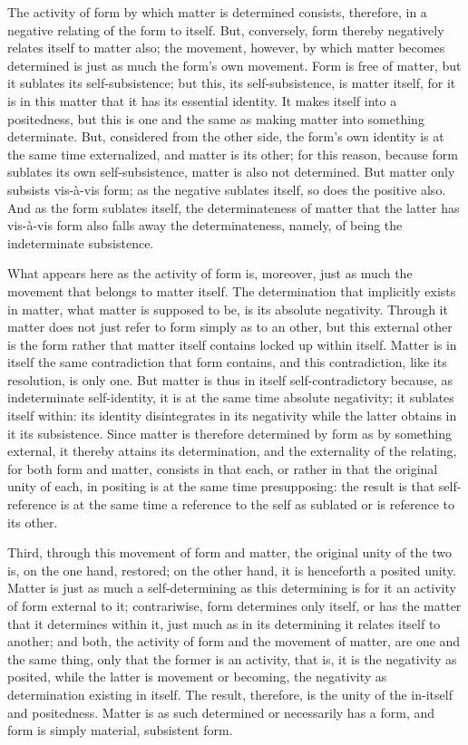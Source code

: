 The activity of form by which matter is determined consists,
therefore, in a negative relating of the form to itself.
But, conversely, form thereby negatively relates itself to matter also;
the movement, however, by which matter becomes determined is
just as much the form's own movement.
Form is free of matter, but it sublates its self-subsistence;
but this, its self-subsistence, is matter itself,
for it is in this matter that it has its essential identity.
It makes itself into a positedness, but this is one and the same
as making matter into something determinate.
But, considered from the other side,
the form's own identity is at the same time externalized,
and matter is its other;
for this reason, because form sublates its own self-subsistence,
matter is also not determined.
But matter only subsists vis-à-vis form;
as the negative sublates itself, so does the positive also.
And as the form sublates itself, the determinateness of matter
that the latter has vis-à-vis form also falls away
the determinateness, namely, of being the indeterminate subsistence.

What appears here as the activity of form is, moreover,
just as much the movement that belongs to matter itself.
The determination that implicitly exists in matter,
what matter is supposed to be, is its absolute negativity.
Through it matter does not just refer to form simply as to an other,
but this external other is the form rather that
matter itself contains locked up within itself.
Matter is in itself the same contradiction that form contains,
and this contradiction, like its resolution, is only one.
But matter is thus in itself self-contradictory because,
as indeterminate self-identity,
it is at the same time absolute negativity;
it sublates itself within:
its identity disintegrates in its negativity
while the latter obtains in it its subsistence.
Since matter is therefore determined by form as by something external,
it thereby attains its determination,
and the externality of the relating, for both form and matter,
consists in that each, or rather in that the original unity of each,
in positing is at the same time presupposing:
the result is that self-reference is at the same time
a reference to the self as sublated or is reference to its other.

Third, through this movement of form and matter,
the original unity of the two is, on the one hand, restored;
on the other hand, it is henceforth a posited unity.
Matter is just as much a self-determining as
this determining is for it an activity of form external to it;
contrariwise, form determines only itself,
or has the matter that it determines within it,
just much as in its determining it relates itself to another;
and both, the activity of form and the movement of matter,
are one and the same thing, only that the former is an activity,
that is, it is the negativity as posited,
while the latter is movement or becoming,
the negativity as determination existing in itself.
The result, therefore, is the unity of the in-itself and positedness.
Matter is as such determined or necessarily has a form,
and form is simply material, subsistent form.


